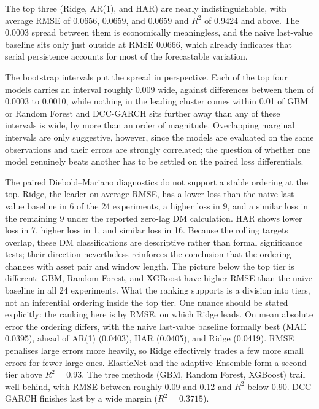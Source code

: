 The top three (Ridge, AR(1), and HAR) are nearly indistinguishable, with average RMSE of 0.0656, 0.0659, and 0.0659 and $R^2$ of 0.9424 and above. The 0.0003 spread between them is economically meaningless, and the naive last-value baseline sits only just outside at RMSE 0.0666, which already indicates that serial persistence accounts for most of the forecastable variation.

The bootstrap intervals put the spread in perspective. Each of the top four models carries an interval roughly 0.009 wide, against differences between them of 0.0003 to 0.0010, while nothing in the leading cluster comes within 0.01 of GBM or Random Forest and DCC-GARCH sits further away than any of these intervals is wide, by more than an order of magnitude. Overlapping marginal intervals are only suggestive, however, since the models are evaluated on the same observations and their errors are strongly correlated; the question of whether one model genuinely beats another has to be settled on the paired loss differentials.

The paired Diebold--Mariano diagnostics do not support a stable ordering at the top. Ridge, the leader on average RMSE, has a lower loss than the naive last-value baseline in 6 of the 24 experiments, a higher loss in 9, and a similar loss in the remaining 9 under the reported zero-lag DM calculation. HAR shows lower loss in 7, higher loss in 1, and similar loss in 16. Because the rolling targets overlap, these DM classifications are descriptive rather than formal significance tests; their direction nevertheless reinforces the conclusion that the ordering changes with asset pair and window length. The picture below the top tier is different: GBM, Random Forest, and XGBoost have higher RMSE than the naive baseline in all 24 experiments. What the ranking supports is a division into tiers, not an inferential ordering inside the top tier. One nuance should be stated explicitly: the ranking here is by RMSE, on which Ridge leads. On mean absolute error the ordering differs, with the naive last-value baseline formally best (MAE 0.0395), ahead of AR(1) (0.0403), HAR (0.0405), and Ridge (0.0419). RMSE penalises large errors more heavily, so Ridge effectively trades a few more small errors for fewer large ones. ElasticNet and the adaptive Ensemble form a second tier above $R^2 = 0.93$. The tree methods (GBM, Random Forest, XGBoost) trail well behind, with RMSE between roughly 0.09 and 0.12 and $R^2$ below 0.90. DCC-GARCH finishes last by a wide margin ($R^2 = 0.3715$).

